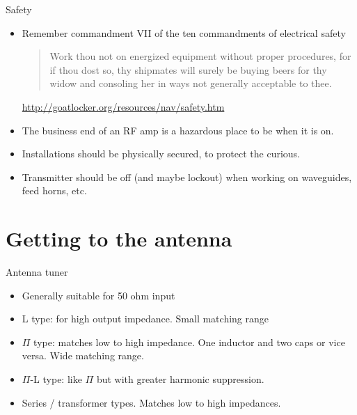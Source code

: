 \documentclass{beamer}
\begin{document}
\begin{frame}{Safety}{}
\begin{itemize}
\item Remember commandment VII of the ten commandments of electrical safety

\begin{quote}
Work thou not on energized equipment without proper procedures, for
if thou dost so, thy shipmates will surely be buying beers for thy widow
and consoling her in ways not generally acceptable to thee.
\end{quote}
\small{\url{http://goatlocker.org/resources/nav/safety.htm}}

\item The business end of an RF amp is a hazardous place to be when it is on.
\item Installations should be physically secured, to protect the curious.
\item Transmitter should be off (and maybe lockout) when working on waveguides, feed horns, etc.
\end{itemize}
\end{frame}


\section{Getting to the antenna}

\begin{frame}{Antenna tuner}{}
\begin{itemize}
\item Generally suitable for 50 ohm input
\item L type: for high output impedance.  Small matching range
\item $\Pi$ type: matches low to high impedance.  One inductor and two caps or vice versa.  Wide matching range.
\item $\Pi$-L type: like $\Pi$ but with greater harmonic suppression.
\item Series / transformer types.  Matches low to high impedances.
\end{itemize}
\end{frame}
\end{document}
